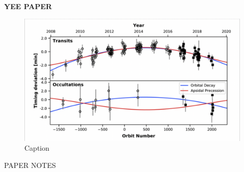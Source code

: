 \documentclass[oneside,12pt]{amsart}
\numberwithin{page}{section}
\begin{document}
\clearpage


\textbf{YEE PAPER}

\begin{figure}[htbp]
    \centering
    \includegraphics[width=0.5\linewidth]{figs/yee_fig4.png}
    \caption{Caption}
    \label{fig:enter-label}
\end{figure}

\clearpage


PAPER NOTES


\cite{adams2024doomed}
\end{document}
